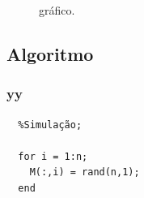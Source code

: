 \documentclass[12pt]{article}
\begin{document}
\begin{figure}[H]

\caption{gráfico.}

\end{figure}

\newpage{}
\subsection{Algoritmo}

\subsubsection{yy}
\begin{verbatim}
  %Simulação;

  for i = 1:n;
    M(:,i) = rand(n,1);
  end

\end{verbatim}
\end{document}
